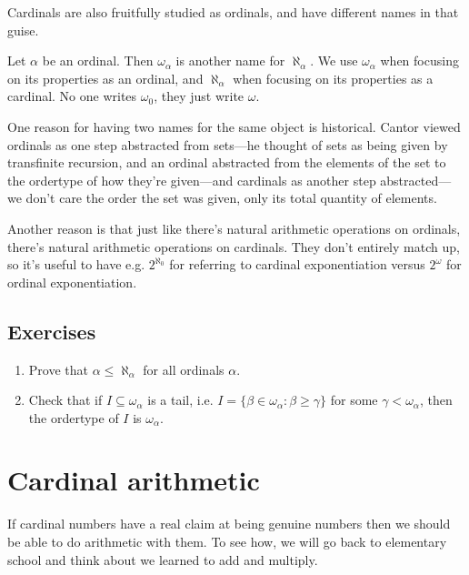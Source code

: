 \documentclass[10pt]{amsart}
\begin{document}
Cardinals are also fruitfully studied as ordinals, and have different names in that guise.

\begin{definition}
Let $\alpha$ be an ordinal. Then $\omega_\alpha$ is another name for $\aleph_\alpha$. We use $\omega_\alpha$ when focusing on its properties as an ordinal, and $\aleph_\alpha$ when focusing on its properties as a cardinal. No one writes $\omega_0$, they just write $\omega$.
\end{definition}

One reason for having two names for the same object is historical. Cantor viewed ordinals as one step abstracted from sets---he thought of sets as being given by transfinite recursion, and an ordinal abstracted from the elements of the set to the ordertype of how they're given---and cardinals as another step abstracted---we don't care the order the set was given, only its total quantity of elements. 

Another reason is that just like there's natural arithmetic operations on ordinals, there's natural arithmetic operations on cardinals. They don't entirely match up, so it's useful to have e.g. $2^{\aleph_0}$ for referring to cardinal exponentiation versus $2^\omega$ for ordinal exponentiation. 

\subsection*{Exercises}

\begin{enumerate}
\item Prove that $\alpha \le \aleph_\alpha$ for all ordinals $\alpha$.
\item Check that if $I \subseteq \omega_\alpha$ is a tail, i.e. $I = \{ \beta \in \omega_\alpha : \beta \ge \gamma\}$ for some $\gamma < \omega_\alpha$, then the ordertype of $I$ is $\omega_\alpha$.
\end{enumerate}

\newpage


\section{Cardinal arithmetic}

If cardinal numbers have a real claim at being genuine numbers then we should be able to do arithmetic with them. To see how, we will go back to elementary school and think about we learned to add and multiply.
\end{document}

